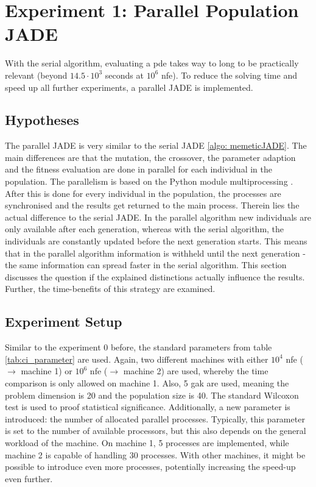 \documentclass[./\jobname.tex]{subfiles}
\begin{document}
\section {Experiment 1: Parallel Population JADE}
\label{chap:experimet_1}
With the serial algorithm, evaluating a \gls{pde} takes way to long to be practically relevant (beyond $14.5 \cdot 10^3$ seconds at $10^6$ \gls{nfe}). To reduce the solving time and speed up all further experiments, a parallel JADE is implemented. 
\subsection{Hypotheses}
The parallel JADE is very similar to the serial JADE \ref{algo: memeticJADE}. The main differences are that the mutation, the crossover, the parameter adaption and the fitness evaluation are done in parallel for each individual in the population. The parallelism is based on the Python module multiprocessing \cite{python_standard_library_multiprocessing_2020}. After this is done for every individual in the population, the processes are synchronised and the results get returned to the main process. Therein lies the actual difference to the serial JADE. In the parallel algorithm new individuals are only available after each generation, whereas with the serial algorithm, the individuals are constantly updated before the next generation starts. This means that in the parallel algorithm information is withheld until the next generation - the same information can spread faster in the serial algorithm. This section discusses the question if the explained distinctions actually influence the results. Further, the time-benefits of this strategy are examined.

\subsection{Experiment Setup}
Similar to the experiment 0 before, the standard parameters from table \ref{tab:ci_parameter} are used. Again, two different machines with either $10^4$ \gls{nfe} ($\rightarrow$ machine 1) or $10^6$ \gls{nfe} ($\rightarrow$ machine 2) are used, whereby the time comparison is only allowed on machine 1. Also, 5 \gls{gak} are used, meaning the problem dimension is 20 and the population size is 40. The standard Wilcoxon test is used to proof statistical significance. Additionally, a new parameter is introduced: the number of allocated parallel processes. Typically, this parameter is set to the number of available processors, but this also depends on the general workload of the machine. On machine 1, 5 processes are implemented, while machine 2 is capable of handling 30 processes. With other machines, it might be possible to introduce even more processes, potentially increasing the speed-up even further. 
\end{document}
